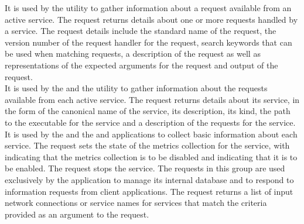 It is used by the  utility to gather information about a
request available from an active service.
The  request returns details about one or more requests
handled by a service.
The request details include the standard name of the request, the version number of the
request handler for the request, search keywords that can be used when matching requests,
a description of the request as well as representations of the expected arguments for the
request and output of the request.\\

It is used by the  and the
 utility to gather information about the requests available
from each active service.
The  request returns details about its service, in the
form of the canonical name of the service, its description, its kind, the path to the
executable for the service and a description of the requests for the service.\\

It is used by the  and the
 and \emph{\MMMU} applications to collect basic information
about each service.
The  request sets the state of the metrics
collection for the service, with  indicating that the metrics collection is
to be disabled and  indicating that it is to be enabled.
The  request stops the service.
\secondaryEnd
{}
The requests in this group are used exclusively by the
 application to manage its internal database and to
respond to information requests from client applications.
The  request returns a list of input \yarp{}
network connections or service names for services that match the criteria provided as an
argument to the request.\\

